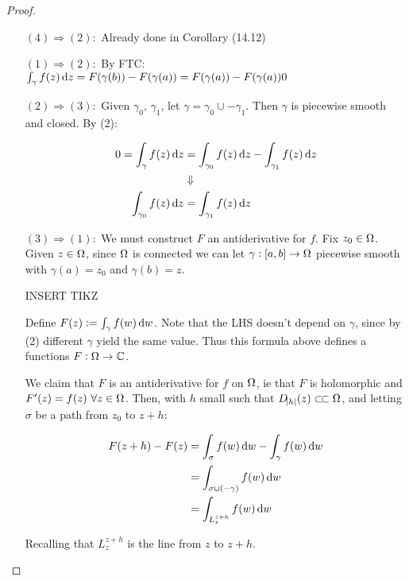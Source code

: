 \begin{proof}
\begin{enumerate}
    \item[$(4)\Rightarrow (2):$] Already done in Corollary (14.12)
    \item[$(1)\Rightarrow (2):$] By FTC: $\int_\gamma f(z) \dif z = F(\gamma(b)) - F(\gamma(a)) = F(\gamma(a)) - F(\gamma(a))0$
    \item[$(2)\Rightarrow (3):$] Given $\gamma_0, \, \gamma_1$, let $\gamma = \gamma_0 \cup -\gamma_1$. Then $\gamma$ is piecewise smooth and closed. By (2):
    
    \begin{align*}
        0= \int_\gamma f(z) \dif z &= \int_{\gamma_0} f(z) \dif z - \int_{\gamma_1} f(z) \dif z\\
        &\Downarrow\\
        \int_{\gamma_0} f(z) \dif z &= \int_{\gamma_1} f(z) \dif z
    \end{align*}
    
    \item[$(3)\Rightarrow (1):$] We must construct $F$ an antiderivative for $f$. Fix $z_0 \in \Omega$. Given $z \in \Omega$, since $\Omega$ is connected we can let $\gamma: [a,b] \to \Omega$ piecewise smooth with $\gamma(a) = z_0$ and $\gamma(b) = z$.
    
    INSERT TIKZ
    
    Define $F(z) \defas \int_\gamma f(w) \dif w$. Note that the LHS doesn't depend on $\gamma$, since by (2) different $\gamma$ yield the same value. Thus this formula above defines a functions $F: \Omega \to \mathbb{C}$.
    
    
    
    We claim that $F$ is an antiderivative for $f$ on $\Omega$, ie that $F$ is holomorphic and $F'(z) = f(z) \, \, \forall z \in \Omega$. Then, with $h$ small such that $D_{\abs{h}} (z) \ssubset \om$, and letting $\sigma$ be a path from $z_0$ to $z+h$:
    
    \begin{align*}
        F(z+h) - F(z) &= \int_\sigma f(w) \dif w - \int_\gamma f(w) \dif w\\
        &= \int_{\sigma \cup (- \gamma) } f(w) \dif w\\
        &= \int_{L_z^{z+h}} f(w) \dif w\\
    \end{align*}
    
    Recalling that $L_z^{z+h}$ is the line from $z$ to $z+h$.
    

\end{enumerate}
\end{proof}
